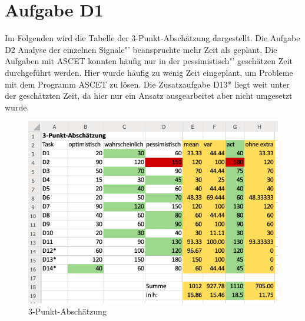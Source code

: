 \chapter{Aufgabe D1}
Im Folgenden wird die Tabelle der 3-Punkt-Abschätzung dargestellt. Die Aufgabe D2 \glqq Analyse der einzelnen Signale"' beanspruchte mehr Zeit als geplant. Die Aufgaben mit ASCET konnten häufig nur in der \glqq pessimistisch"' geschätzen Zeit durchgeführt werden. Hier wurde häufig zu wenig Zeit eingeplant, um Probleme mit dem Programm ASCET zu lösen. Die Zusatzaufgabe D13* liegt weit unter der geschätzten Zeit, da hier nur ein Ansatz ausgearbeitet aber nicht umgesetzt wurde.\\

\begin{figure}[h!]
	\centering
	\includegraphics[width=1\linewidth]{../Graphiken/Schaetzung.png}
	\caption{3-Punkt-Abschätzung}
	\label{fig:schaetzung}
\end{figure}